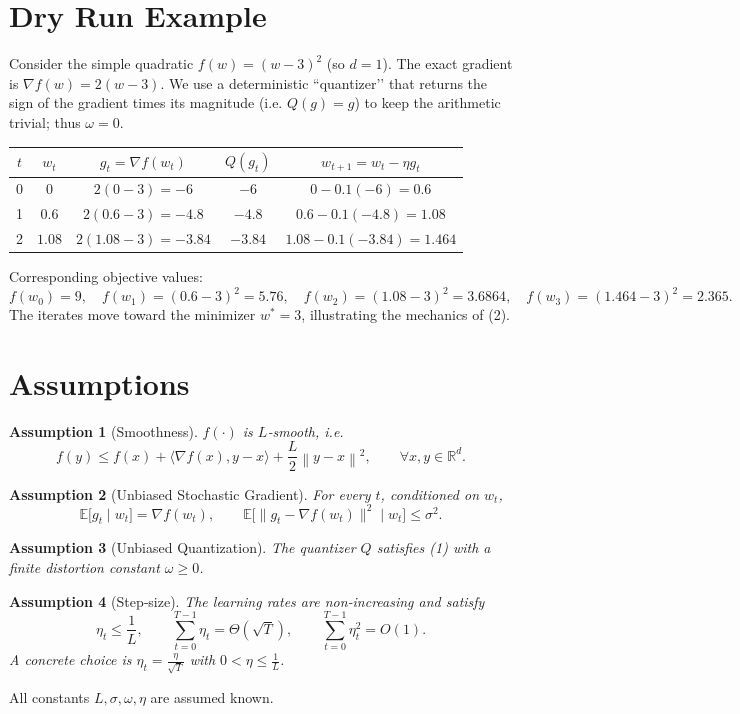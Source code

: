 \documentclass[11pt]{article}
\newtheorem{assumption}{Assumption}
\newcommand{\E}{\mathbb{E}}
\newcommand{\norm}[1]{\left\lVert#1\right\rVert}
\newcommand{\ip}[2]{\langle #1, #2\rangle}
\begin{document}
\section*{Dry Run Example}
Consider the simple quadratic $f(w)=(w-3)^2$ (so $d=1$).  
The exact gradient is $\nabla f(w)=2(w-3)$.  
We use a deterministic “quantizer’’ that returns the sign of the gradient times its magnitude (i.e. $Q(g)=g$) to keep the arithmetic trivial; thus $\omega=0$.

\begin{center}
\begin{tabular}{c|c|c|c|c}
$t$ & $w_t$ & $g_t= \nabla f(w_t)$ & $Q(g_t)$ & $w_{t+1}=w_t-\eta g_t$ \\ \hline
0 & $0$ & $2(0-3)=-6$ & $-6$ & $0-0.1(-6)=0.6$ \\
1 & $0.6$ & $2(0.6-3)=-4.8$ & $-4.8$ & $0.6-0.1(-4.8)=1.08$ \\
2 & $1.08$ & $2(1.08-3)=-3.84$ & $-3.84$ & $1.08-0.1(-3.84)=1.464$ \\
\end{tabular}
\end{center}
Corresponding objective values:
\[
f(w_0)=9,\quad f(w_1)=(0.6-3)^2=5.76,\quad f(w_2)=(1.08-3)^2=3.6864,\quad f(w_3)=(1.464-3)^2=2.365.
\]
The iterates move toward the minimizer $w^{*}=3$, illustrating the mechanics of (2).

\section*{Assumptions}
\begin{assumption}[Smoothness]\label{ass:smooth}
$f(\cdot)$ is $L$‑smooth, i.e.
\[
f(y)\le f(x)+\ip{\nabla f(x)}{y-x}+\frac{L}{2}\norm{y-x}^{2},
\qquad\forall x,y\in\mathbb{R}^{d}.
\tag{A1}
\]
\end{assumption}
\begin{assumption}[Unbiased Stochastic Gradient]\label{ass:unbiased}
For every $t$, conditioned on $w_t$,
\[
\E\bigl[g_t\mid w_t\bigr]=\nabla f(w_t),\qquad 
\E\bigl[\|g_t-\nabla f(w_t)\|^{2}\mid w_t\bigr]\le\sigma^{2}.
\tag{A2}
\]
\end{assumption}
\begin{assumption}[Unbiased Quantization]\label{ass:quant}
The quantizer $Q$ satisfies (1) with a finite distortion constant $\omega\ge0$.
\end{assumption}
\begin{assumption}[Step‑size]\label{ass:stepsize}
The learning rates are non‑increasing and satisfy
\[
\eta_t\le \frac{1}{L},\qquad 
\sum_{t=0}^{T-1}\eta_t = \Theta(\sqrt{T}),\qquad 
\sum_{t=0}^{T-1}\eta_t^{2}= O(1).
\tag{A4}
\]
A concrete choice is $\displaystyle \eta_t=\frac{\eta}{\sqrt{T}}$ with $0<\eta\le \frac{1}{L}$.
\end{assumption}
All constants $L,\sigma,\omega,\eta$ are assumed known.
\end{document}
